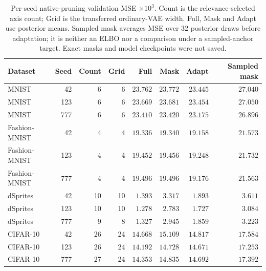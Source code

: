 \begin{table}[H]
\caption{Per-seed native-pruning validation MSE $\times10^3$. Count is the relevance-selected axis count; Grid is the transferred ordinary-VAE width. Full, Mask and Adapt use posterior means. Sampled mask averages MSE over 32 posterior draws before adaptation; it is neither an ELBO nor a comparison under a sampled-anchor target. Exact masks and model checkpoints were not saved.}\label{tab:ardprunedseeds}
\footnotesize
\setlength{\tabcolsep}{3pt}
\begin{tabular*}{\textwidth}{@{\extracolsep{\fill}}lrrrrrrr@{}}
\toprule
Dataset & Seed & Count & Grid & Full & Mask & Adapt & Sampled mask \\
\midrule
MNIST & 42 & 6 & 6 & $23.762$ & $23.772$ & $23.445$ & $27.040$ \\
MNIST & 123 & 6 & 6 & $23.669$ & $23.681$ & $23.454$ & $27.050$ \\
MNIST & 777 & 6 & 6 & $23.410$ & $23.420$ & $23.175$ & $26.896$ \\
Fashion-MNIST & 42 & 4 & 4 & $19.336$ & $19.340$ & $19.158$ & $21.573$ \\
Fashion-MNIST & 123 & 4 & 4 & $19.452$ & $19.456$ & $19.248$ & $21.732$ \\
Fashion-MNIST & 777 & 4 & 4 & $19.496$ & $19.496$ & $19.176$ & $21.563$ \\
dSprites & 42 & 10 & 10 & $1.393$ & $3.317$ & $1.893$ & $3.611$ \\
dSprites & 123 & 10 & 10 & $1.278$ & $2.783$ & $1.727$ & $3.084$ \\
dSprites & 777 & 9 & 8 & $1.327$ & $2.945$ & $1.859$ & $3.223$ \\
CIFAR-10 & 42 & 26 & 24 & $14.668$ & $15.109$ & $14.817$ & $17.584$ \\
CIFAR-10 & 123 & 26 & 24 & $14.192$ & $14.728$ & $14.671$ & $17.253$ \\
CIFAR-10 & 777 & 27 & 24 & $14.353$ & $14.835$ & $14.692$ & $17.392$ \\
\bottomrule\end{tabular*}
\end{table}
